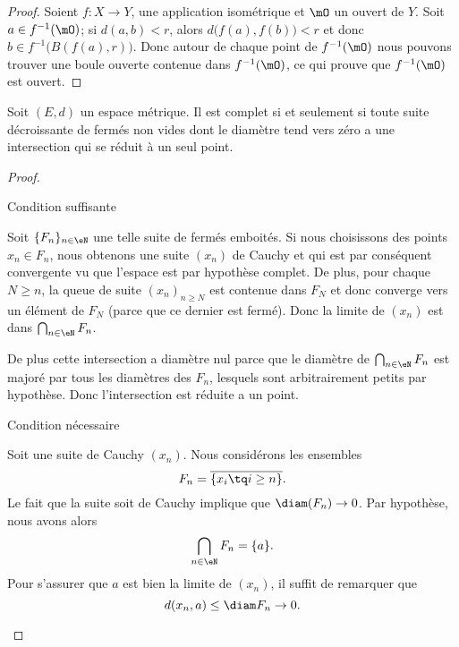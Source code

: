 \begin{proof}
    Soient \( f\colon X\to Y\), une application isométrique et \( \mO\) un ouvert de \( Y\). Soit \( a\in f^{-1}(\mO)\); si \( d(a,b)<r\), alors \( d\big( f(a),f(b) \big)<r\) et donc \( b\in f^{-1}\big( B(f(a),r) \big)\). Donc autour de chaque point de \( f^{-1}(\mO)\) nous pouvons trouver une boule ouverte contenue dans \( f^{-1}(\mO)\), ce qui prouve que \( f^{-1}(\mO)\) est ouvert.
\end{proof}

\begin{theorem}
    Soit \( (E,d)\) un espace métrique. Il est complet si et seulement si toute suite décroissante de fermés non vides dont le diamètre tend vers zéro a une intersection qui se réduit à un seul point.
\end{theorem}

\begin{proof}
    \begin{subproof}
    \item[Condition suffisante]

        Soit \( \{ F_n \}_{n\in \eN}\) une telle suite de fermés emboités. Si nous choisissons des points \( x_n\in F_n\), nous obtenons une suite \( (x_n)\) de Cauchy et qui est par conséquent convergente vu que l'espace est par hypothèse complet. De plus, pour chaque \( N\geq n\), la queue de suite \( (x_n)_{n\geq N}\) est contenue dans \( F_N\) et donc converge vers un élément de \( F_N\) (parce que ce dernier est fermé). Donc la limite de \( (x_n)\) est dans \( \bigcap_{n\in \eN}F_n\).

        De plus cette intersection a diamètre nul parce que le diamètre de \( \bigcap_{n\in \eN}F_n\) est majoré par tous les diamètres des \( F_n\), lesquels sont arbitrairement petits par hypothèse. Donc l'intersection est réduite a un point.

    \item[Condition nécessaire]

        Soit une suite de Cauchy \( (x_n)\). Nous considérons les ensembles
        \begin{equation}
            F_n=\overline{ \{ x_i\tq i\geq n \} }.
        \end{equation}
        Le fait que la suite soit de Cauchy implique que \( \diam(F_n)\to 0\). Par hypothèse, nous avons alors
        \begin{equation}
            \bigcap_{n\in \eN}F_n=\{ a \}.
        \end{equation}
        Pour s'assurer que \( a\) est bien la limite de \( (x_n)\), il suffit de remarquer que
        \begin{equation}
            d(x_n,a)\leq \diam F_n\to 0.
        \end{equation}
    \end{subproof}
\end{proof}


